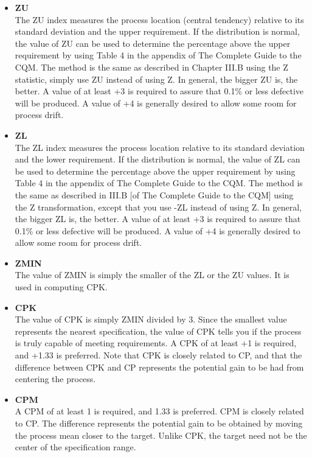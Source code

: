 \documentclass[]{article}
\begin{document}
{\begin{itemize}
\item\textbf{ ZU}\\
The ZU index measures the process location (central tendency) relative to its standard deviation and the upper requirement. If the distribution is normal, the value of ZU can be used to determine the percentage above the upper requirement by using Table 4 in the appendix of The Complete Guide to the CQM. The method is the same as described in Chapter III.B using the Z statistic, simply use ZU instead of using Z. In general, the bigger ZU is, the better. A value of at least +3 is required to assure that 0.1\% or less defective will be produced. A value of +4 is generally desired to allow some room for process drift.

\item \textbf{ZL}\\
The ZL index measures the process location relative to its standard deviation and the lower requirement. If the distribution is normal, the value of ZL can be used to determine the percentage above the upper requirement by using Table 4 in the appendix of The Complete Guide to the CQM. The method is the same as described in III.B [of The Complete Guide to the CQM] using the Z transformation, except that you use -ZL instead of using Z. In general, the bigger ZL is, the better. A value of at least +3 is required to assure that 0.1\% or less defective will be produced. A value of +4 is generally desired to allow some room for process drift.

\item \textbf{ZMIN}\\
The value of ZMIN is simply the smaller of the ZL or the ZU values. It is used in computing CPK.

\item\textbf{ CPK}\\
The value of CPK is simply ZMIN divided by 3. Since the smallest value represents the nearest specification, the value of CPK tells you if the process is truly capable of meeting requirements. A CPK of at least +1 is required, and +1.33 is preferred. Note that CPK is closely related to CP, and that the difference between CPK and CP represents the potential gain to be had from centering the process.

\item\textbf{ CPM}\\
A CPM of at least 1 is required, and 1.33 is preferred. CPM is closely related to CP. The difference represents the potential gain to be obtained by moving the process mean closer to the target. Unlike CPK, the target need not be the center of the specification range.
\end{itemize}
\newpage
}
\end{document}
